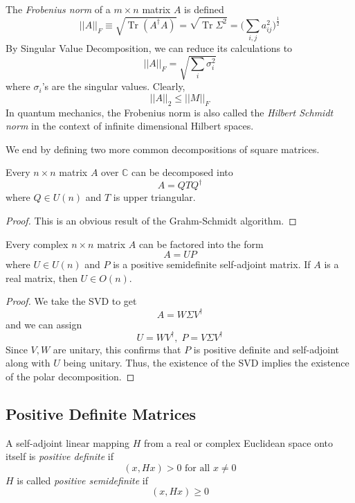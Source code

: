 \documentclass{article}
\DeclareMathOperator{\Tr}{Tr}
\begin{document}
    \begin{definition}
    The \textit{Frobenius norm} of a $m \times n$ matrix $A$ is defined
    \[||A||_F \equiv \sqrt{\Tr{(A^\dagger A)}} = \sqrt{\Tr{\Sigma^2}} = \bigg( \sum_{i, j} a_{i j}^2 \bigg)^{\frac{1}{2}} \]
    By Singular Value Decomposition, we can reduce its calculations to
    \[ ||A||_F = \sqrt{\sum_i \sigma_i^2}\]
    where $\sigma_i$'s are the singular values. Clearly, 
    \[||A||_2 \leq ||M||_F\]
    In quantum mechanics, the Frobenius norm is also called the \textit{Hilbert Schmidt norm} in the context of infinite dimensional Hilbert spaces. 
    \end{definition}

    We end by defining two more common decompositions of square matrices. 

    \begin{theorem}
    Every $n \times n$ matrix $A$ over $\mathbb{C}$ can be decomposed into
    \[A = Q T Q^\dagger\]
    where $Q \in U(n)$ and $T$ is upper triangular. 
    \end{theorem}
    \begin{proof}
    This is an obvious result of the Grahm-Schmidt algorithm. 
    \end{proof}

    \begin{theorem}
    Every complex $n \times n$ matrix $A$ can be factored into the form
    \[A = U P\]
    where $U \in U(n)$ and $P$ is a positive semidefinite self-adjoint matrix. If $A$ is a real matrix, then $U \in O(n)$. 
    \end{theorem}
    \begin{proof}
    We take the SVD to get 
    \[A = W \Sigma V^\dagger\]
    and we can assign 
    \[U = W V^\dagger, \; P = V \Sigma V^\dagger\]
    Since $V, W$ are unitary, this confirms that $P$ is positive definite and self-adjoint along with $U$ being unitary. Thus, the existence of the SVD implies the existence of the polar decomposition. 
    \end{proof}

  \subsection{Positive Definite Matrices}

    \begin{definition}
    A self-adjoint linear mapping $H$ from a real or complex Euclidean space onto itself is \textit{positive definite} if 
    \[(x, H x) > 0 \text{ for all } x \neq 0\]
    $H$ is called \textit{positive semidefinite} if 
    \[(x, H x) \geq 0\]
    \end{definition}
\end{document}
